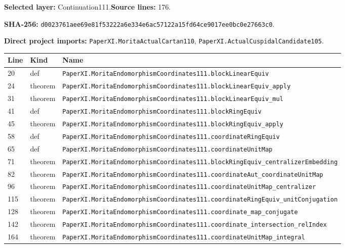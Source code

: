 \documentclass[10pt,oneside]{book}
\begin{document}
\textbf{Selected layer:} Continuation111.\quad\textbf{Source lines:} 176.\par\textbf{SHA-256:} {\scriptsize\nolinkurl{d0023761aee69e81f53222a6e334e6ac57122a15fd64ce9017ee0bc0e27663c0}}.


\textbf{Direct project imports:} \nolinkurl{PaperXI.MoritaActualCartan110}, \nolinkurl{PaperXI.ActualCuspidalCandidate105}.

\begin{longtable}{@{}p{}p{}p{}@{}}\toprule Line&Kind&Name\\\midrule\endhead

20&def&\nolinkurl{PaperXI.MoritaEndomorphismCoordinates111.blockLinearEquiv}\\

24&theorem&\nolinkurl{PaperXI.MoritaEndomorphismCoordinates111.blockLinearEquiv_apply}\\

31&theorem&\nolinkurl{PaperXI.MoritaEndomorphismCoordinates111.blockLinearEquiv_mul}\\

41&def&\nolinkurl{PaperXI.MoritaEndomorphismCoordinates111.blockRingEquiv}\\

45&theorem&\nolinkurl{PaperXI.MoritaEndomorphismCoordinates111.blockRingEquiv_apply}\\

58&def&\nolinkurl{PaperXI.MoritaEndomorphismCoordinates111.coordinateRingEquiv}\\

65&def&\nolinkurl{PaperXI.MoritaEndomorphismCoordinates111.coordinateUnitMap}\\

71&theorem&\nolinkurl{PaperXI.MoritaEndomorphismCoordinates111.blockRingEquiv_centralizerEmbedding}\\

82&theorem&\nolinkurl{PaperXI.MoritaEndomorphismCoordinates111.coordinateAut_coordinateUnitMap}\\

96&theorem&\nolinkurl{PaperXI.MoritaEndomorphismCoordinates111.coordinateUnitMap_centralizer}\\

115&theorem&\nolinkurl{PaperXI.MoritaEndomorphismCoordinates111.coordinateRingEquiv_unitConjugation}\\

128&theorem&\nolinkurl{PaperXI.MoritaEndomorphismCoordinates111.coordinate_map_conjugate}\\

142&theorem&\nolinkurl{PaperXI.MoritaEndomorphismCoordinates111.coordinate_intersection_relIndex}\\

164&theorem&\nolinkurl{PaperXI.MoritaEndomorphismCoordinates111.coordinateUnitMap_integral}\\

\bottomrule\end{longtable}
\end{document}
